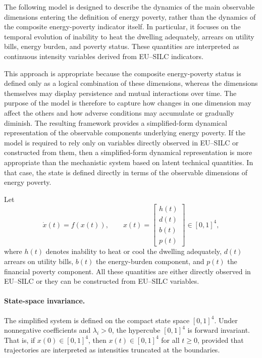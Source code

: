 \documentclass[11pt,a4paper]{article}
\begin{document}
The following model is designed to describe the dynamics of the main observable dimensions entering the definition of energy poverty, rather than the dynamics of the composite energy-poverty indicator itself. In particular, it focuses on the temporal evolution of inability to heat the dwelling adequately, arrears on utility bills, energy burden, and poverty status. These quantities are interpreted as continuous intensity variables derived from EU--SILC indicators.

This approach is appropriate because the composite energy-poverty status is defined only as a logical combination of these dimensions, whereas the dimensions themselves may display persistence and mutual interactions over time. The purpose of the model is therefore to capture how changes in one dimension may affect the others and how adverse conditions may accumulate or gradually diminish. The resulting framework provides a simplified-form dynamical representation of the observable components underlying energy poverty.
If the model is required to rely only on variables directly observed in EU--SILC or constructed from them, then a simplified-form dynamical representation is more appropriate than the mechanistic system based on latent technical quantities. In that case, the state is defined directly in terms of the observable dimensions of energy poverty.

Let
\[
\dot{x}(t) = f(x(t)), 
\qquad 
x(t)=
\begin{bmatrix}
h(t)\\
d(t)\\
b(t)\\
p(t)
\end{bmatrix}\in[0,1]^4,
\]
where \(h(t)\) denotes inability to heat or cool the dwelling adequately, \(d(t)\) arrears on utility bills, \(b(t)\) the energy-burden component, and \(p(t)\) the financial poverty component. All these quantities are either directly observed in EU--SILC or they can be constructed from EU--SILC variables.


\paragraph{State-space invariance.}
The simplified system is defined on the compact state space $[0,1]^4$. Under
nonnegative coefficients and $\lambda_i>0$, the hypercube $[0,1]^4$ is forward
invariant. That is, if $x(0)\in[0,1]^4$, then $x(t)\in[0,1]^4$ for all $t\ge0$,
provided that trajectories are interpreted as intensities truncated at the
boundaries.
\end{document}
